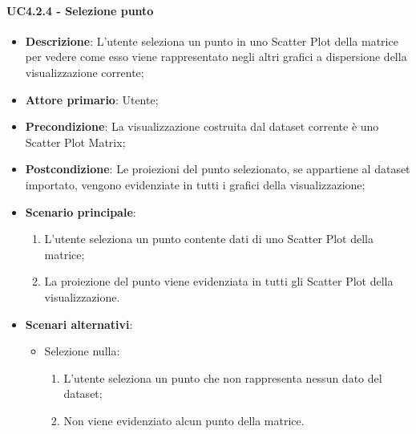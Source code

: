 \paragraph{UC4.2.4 - Selezione punto}
\label{par:uc4.2.4}
\begin{itemize}
    \item \textbf{Descrizione}: L'utente seleziona un punto in uno Scatter Plot della matrice per vedere come
                                esso viene rappresentato negli altri grafici a dispersione della visualizzazione corrente;

    \item \textbf{Attore primario}: Utente;

    \item \textbf{Precondizione}:   La visualizzazione costruita dal dataset corrente è uno Scatter Plot Matrix;
    \item \textbf{Postcondizione}:  Le proiezioni del punto selezionato, se appartiene al dataset importato,
                                    vengono evidenziate in tutti i grafici della visualizzazione;

	\item \textbf{Scenario principale}:
        \begin{enumerate}
            \item L'utente seleziona un punto contente dati di uno Scatter Plot della matrice;
            \item La proiezione del punto viene evidenziata in tutti gli Scatter Plot della visualizzazione.
        \end{enumerate}

    \item \textbf{Scenari alternativi}:
    \begin{itemize}
        \item Selezione nulla:
        \begin{enumerate}
            \item L'utente seleziona un punto che non rappresenta nessun dato del dataset;
            \item Non viene evidenziato alcun punto della matrice.
        \end{enumerate}
    \end{itemize}

\end{itemize}


